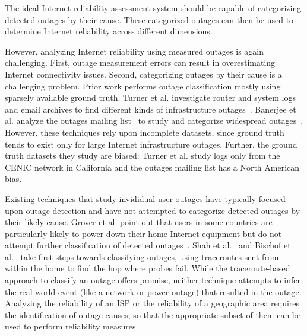 The ideal Internet reliability assessment system should be capable of
categorizing detected outages by their cause. These categorized
outages can then be used to determine Internet reliability across
different dimensions.

However, analyzing Internet reliability using measured outages is
again challenging. First, outage measurement errors can result in
overestimating Internet connectivity issues. Second, categorizing
outages by their cause is a challenging problem. Prior work performs
outage classification mostly using sparsely available ground
truth. Turner et al. investigate router and system logs and email
archives to find different kinds of infrastructure
outages~\cite{california-fault-lines}. Banerjee et al. analyze the
outages mailing list~\cite{outages-mailing-list} to study and
categorize widespread
outages~\cite{phillipa-outages-mailing-list}. However, these
techniques rely upon incomplete datasets, since ground truth tends to
exist only for large Internet infrastructure outages. Further, the
ground truth datasets they study are biased: Turner et al. study logs only
from the CENIC network in California and the outages mailing list has
a North American bias. 

Existing techniques that study invididual user
outages have typically focused upon outage detection and have not
attempted to categorize detected outages by their likely cause. Grover
et al. point out that users in some countries are particularly likely
to power down their home Internet equipment but do not attempt further
classification of detected outages~\cite{grover2013peeking}. Shah et
al.~\cite{disco} and Bischof et al.~\cite{alwayson} take first steps
towards classifying outages, using traceroutes sent from within the
home to find the hop where probes fail. While the traceroute-based
approach to classify an outage offers promise, neither technique
attempts to infer the real world event (like a network or power
outage) that resulted in the outage. Analyzing the reliability of an
ISP or the reliability of a geographic area requires the
identification of outage causes, so that the appropriate subset of
them can be used to perform reliability measures. 




 
